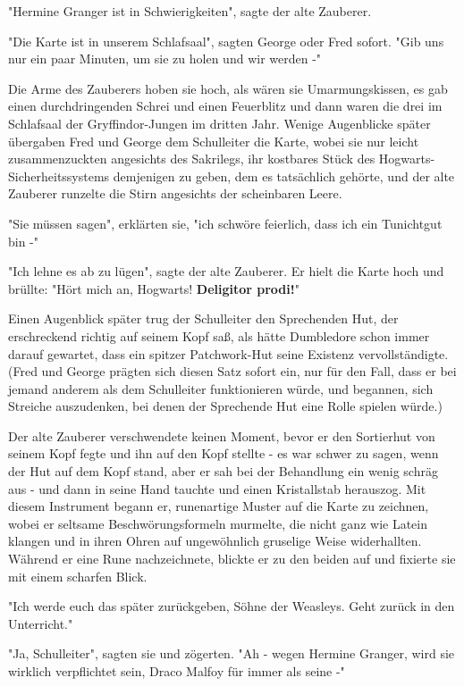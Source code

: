 {"Hermine Granger ist in Schwierigkeiten", sagte der alte Zauberer.

"Die Karte ist in unserem Schlafsaal", sagten George oder Fred sofort. "Gib uns nur ein paar Minuten, um sie zu holen und wir werden -"

Die Arme des Zauberers hoben sie hoch, als wären sie Umarmungskissen, es gab einen durchdringenden Schrei und einen Feuerblitz und dann waren die drei im Schlafsaal der Gryffindor-Jungen im dritten Jahr. Wenige Augenblicke später übergaben Fred und George dem Schulleiter die Karte, wobei sie nur leicht zusammenzuckten angesichts des Sakrilegs, ihr kostbares Stück des Hogwarts-Sicherheitssystems demjenigen zu geben, dem es tatsächlich gehörte, und der alte Zauberer runzelte die Stirn angesichts der scheinbaren Leere.

"Sie müssen sagen", erklärten sie, "ich schwöre feierlich, dass ich ein Tunichtgut bin -"

"Ich lehne es ab zu lügen", sagte der alte Zauberer. Er hielt die Karte hoch und brüllte: "Hört mich an, Hogwarts! \textbf{Deligitor prodi!}"

Einen Augenblick später trug der Schulleiter den Sprechenden Hut, der erschreckend richtig auf seinem Kopf saß, als hätte Dumbledore schon immer darauf gewartet, dass ein spitzer Patchwork-Hut seine Existenz vervollständigte. (Fred und George prägten sich diesen Satz sofort ein, nur für den Fall, dass er bei jemand anderem als dem Schulleiter funktionieren würde, und begannen, sich Streiche auszudenken, bei denen der Sprechende Hut eine Rolle spielen würde.)

Der alte Zauberer verschwendete keinen Moment, bevor er den Sortierhut von seinem Kopf fegte und ihn auf den Kopf stellte - es war schwer zu sagen, wenn der Hut auf dem Kopf stand, aber er sah bei der Behandlung ein wenig schräg aus - und dann in seine Hand tauchte und einen Kristallstab herauszog. Mit diesem Instrument begann er, runenartige Muster auf die Karte zu zeichnen, wobei er seltsame Beschwörungsformeln murmelte, die nicht ganz wie Latein klangen und in ihren Ohren auf ungewöhnlich gruselige Weise widerhallten. Während er eine Rune nachzeichnete, blickte er zu den beiden auf und fixierte sie mit einem scharfen Blick.

"Ich werde euch das später zurückgeben, Söhne der Weasleys. Geht zurück in den Unterricht."

"Ja, Schulleiter", sagten sie und zögerten. "Ah - wegen Hermine Granger, wird sie wirklich verpflichtet sein, Draco Malfoy für immer als seine -"

}
